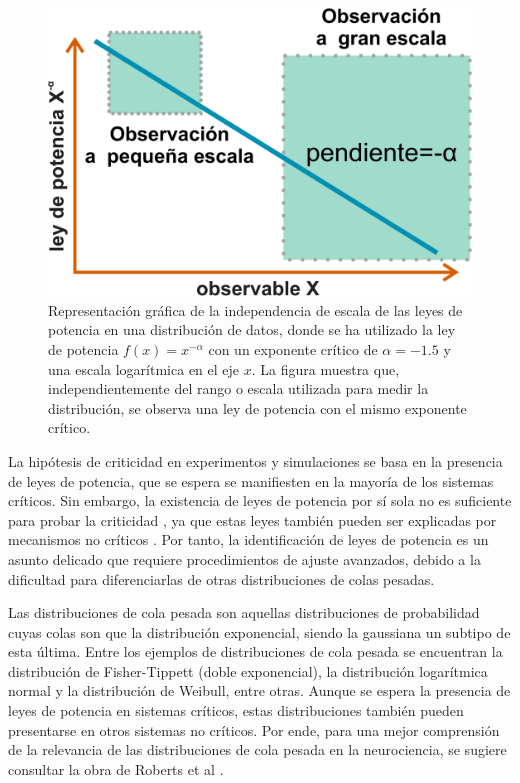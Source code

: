 \begin{figure}[ht]
	\centering\includegraphics[width=\imsize]{ley_potencia}
	\caption[Representación gráfica de la independencia de escala de las leyes de potencia en una distribución de datos.]{Representación gráfica de la independencia de escala de las leyes de potencia en una distribución de datos, donde se ha utilizado la ley de potencia $f(x) = x^{-\alpha}$  con un exponente crítico de $\alpha=-1.5$ y una escala logarítmica en el eje $x$. La figura muestra que, independientemente del rango o escala utilizada para medir la distribución, se observa una ley de potencia con el mismo exponente crítico.} 	\label{fig:leypotencia}
\end{figure}


La hipótesis de criticidad en experimentos y simulaciones se basa en la presencia de leyes de potencia, que se espera se manifiesten en la mayoría de los sistemas críticos. Sin embargo, la existencia de leyes de potencia por sí sola no es suficiente para probar la criticidad \cite{goldstein_problems_2004,priesemann_can_2018}, ya que estas leyes también pueden ser explicadas por mecanismos no críticos \cite{touboul_can_2010,markovic_power_2014,noauthor_critical_2006,beggs_being_2012}. Por tanto, la identificación de leyes de potencia es un asunto delicado que requiere procedimientos de ajuste avanzados, debido a la dificultad para diferenciarlas de otras distribuciones de colas pesadas.

Las distribuciones de cola pesada son aquellas distribuciones de probabilidad cuyas colas son  que la distribución exponencial, siendo la gaussiana un subtipo de esta última. Entre los ejemplos de distribuciones de cola pesada se encuentran la distribución de Fisher-Tippett (doble exponencial), la distribución logarítmica normal y la distribución de Weibull, entre otras. Aunque se espera la presencia de leyes de potencia en sistemas críticos, estas distribuciones también pueden presentarse en otros sistemas no críticos. Por ende, para una mejor comprensión de la relevancia de las distribuciones de cola pesada en la neurociencia, se sugiere consultar la obra de Roberts et al  \cite{roberts_heavy_2015}.

